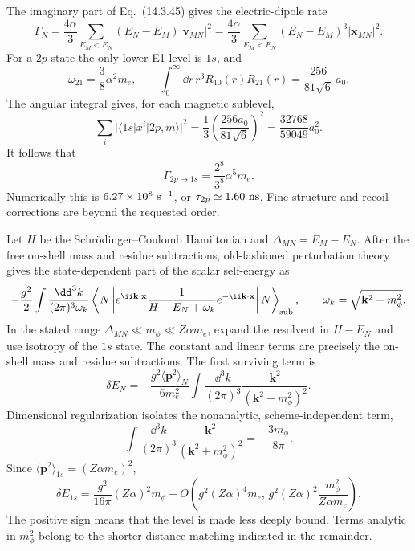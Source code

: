 \begin{enumerate}
The imaginary part of Eq.~(14.3.45) gives the electric-dipole rate
\[
 \Gamma_N=\frac{4\alpha}{3}\sum_{E_M<E_N}
 (E_N-E_M)|\mathbf v_{MN}|^2
 =\frac{4\alpha}{3}\sum_{E_M<E_N}
 (E_N-E_M)^3|\mathbf x_{MN}|^2 .
\]
For a \(2p\) state the only lower E1 level is \(1s\), and
\[
 \omega_{21}=\frac{3}{8}\alpha^2m_e,\qquad
 \int_0^\infty \dd r\,r^3R_{10}(r)R_{21}(r)
 =\frac{256}{81\sqrt6}\,a_0 .
\]
The angular integral gives, for each magnetic sublevel,
\[
 \sum_i|\langle1s|x^i|2p,m\rangle|^2
 =\frac13\left(\frac{256a_0}{81\sqrt6}\right)^2
 =\frac{32768}{59049}a_0^2 .
\]
It follows that
\[
 \boxed{\displaystyle
 \Gamma_{2p\to1s}=\frac{2^8}{3^8}\alpha^5m_e .}
\]
Numerically this is \(6.27\times10^8\ {\rm s}^{-1}\), or
\(\tau_{2p}\simeq1.60\ {\rm ns}\).  Fine-structure and recoil corrections
are beyond the requested order.

Let \(H\) be the Schrödinger--Coulomb Hamiltonian and
\(\Delta_{MN}=E_M-E_N\).  After the free on-shell mass and residue
subtractions, old-fashioned perturbation theory gives the state-dependent
part of the scalar self-energy as
\[
 -\frac{g^2}{2}\int\frac{\dd^3k}{(2\pi)^3\omega_k}
 \left\langle N\left|
 e^{\ii\mathbf k\cdot\mathbf x}
 \frac1{H-E_N+\omega_k}
 e^{-\ii\mathbf k\cdot\mathbf x}
 \right|N\right\rangle_{\rm sub},
 \qquad \omega_k=\sqrt{\mathbf k^2+m_\phi^2}.
\]
In the stated range \(\Delta_{MN}\ll m_\phi\ll Z\alpha m_e\), expand the
resolvent in \(H-E_N\) and use isotropy of the \(1s\) state.  The constant
and linear terms are precisely the on-shell mass and residue subtractions.
The first surviving term is
\[
 \delta E_N=-\frac{g^2\langle\mathbf p^2\rangle_N}{6m_e^2}
 \int\frac{\dd^3k}{(2\pi)^3}
 \frac{\mathbf k^2}{(\mathbf k^2+m_\phi^2)^2}.
\]
Dimensional regularization isolates the nonanalytic, scheme-independent
term,
\[
 \int\frac{\dd^3k}{(2\pi)^3}
 \frac{\mathbf k^2}{(\mathbf k^2+m_\phi^2)^2}
 =-\frac{3m_\phi}{8\pi}.
\]
Since \(\langle\mathbf p^2\rangle_{1s}=(Z\alpha m_e)^2\),
\[
 \boxed{\displaystyle
 \delta E_{1s}=\frac{g^2}{16\pi}(Z\alpha)^2m_\phi
 {}+O\!\left(g^2(Z\alpha)^4m_e,\,
 g^2(Z\alpha)^2\frac{m_\phi^2}{Z\alpha m_e}\right).}
\]
The positive sign means that the level is made less deeply bound.  Terms
analytic in \(m_\phi^2\) belong to the shorter-distance matching indicated
in the remainder.


\end{enumerate}

